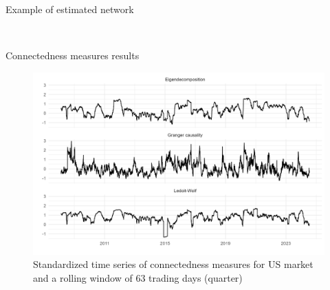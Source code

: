 \documentclass{beamer}
\begin{document}
\begin{frame}{Example of estimated network}
	\begin{figure}%
		\centering
		\quad
		\\
		
		
	\end{figure}
	
\end{frame}

\begin{frame}{Connectedness measures results}

\begin{figure}[H]
    \caption{Standardized time series of connectedness measures for US market and a rolling window of 63 trading days (quarter)}
    \includegraphics[scale=0.5]{connect_ts.png}
    \centering
\end{figure}    

\end{frame}    
\end{document}

